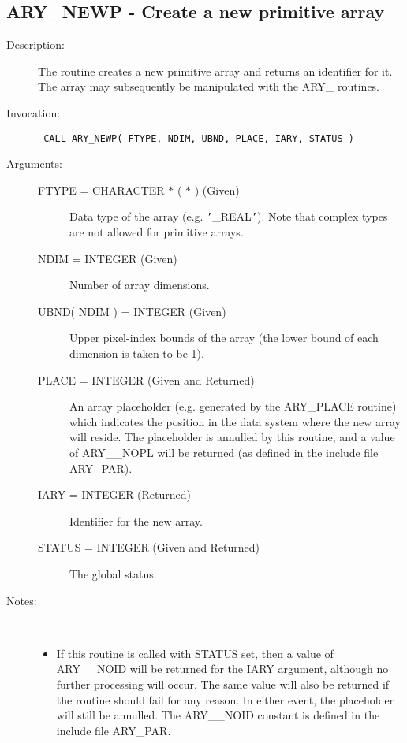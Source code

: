 \documentclass[twoside,11pt]{article}
\newcommand{\xlabel}[1]{}
\newlength{\sstbannerlength}
\newlength{\sstcaptionlength}
\newlength{\sstexampleslength}
\newlength{\sstexampleswidth}
\newcommand{\sstroutine}[3]{
   \goodbreak
   \rule{\textwidth}{0.5mm}
   \vspace{-7ex}
   \newline
   \settowidth{\sstbannerlength}{{\Large {\bf #1}}}
   \setlength{\sstcaptionlength}{\textwidth}
   \setlength{\sstexampleslength}{\textwidth}
   \addtolength{\sstbannerlength}{0.5em}
   \addtolength{\sstcaptionlength}{-2.0\sstbannerlength}
   \addtolength{\sstcaptionlength}{-5.0pt}
   \settowidth{\sstexampleswidth}{{\bf Examples:}}
   \addtolength{\sstexampleslength}{-\sstexampleswidth}
   \parbox[t]{\sstbannerlength}{\flushleft{\Large {\bf #1}}}
   \parbox[t]{\sstcaptionlength}{\center{\Large #2}}
   \parbox[t]{\sstbannerlength}{\flushright{\Large {\bf #1}}}
   \begin{description}
      #3
   \end{description}
}
\newcommand{\sstdescription}[1]{\item[Description:] #1}
\newcommand{\sstinvocation}[1]{\item[Invocation:]\hspace{0.4em}{\tt #1}}
\newcommand{\sstarguments}[1]{
   \item[Arguments:] \mbox{} \\
   \vspace{-3.5ex}
   \begin{description}
      #1
   \end{description}
}
\newcommand{\sstsubsection}[1]{ \item[{#1}] \mbox{} \\}
\newcommand{\sstnotes}[1]{\item[Notes:] \mbox{} \\[1.3ex] #1}
\newcommand{\sstitemlist}[1]{
  \mbox{} \\
  \vspace{-3.5ex}
  \begin{itemize}
     #1
  \end{itemize}
}
\newcommand{\sstitem}{\item}
\newcommand{\ssttt}{\tt}
\renewcommand{\sstroutine}[3]{
      \subsection{#1\xlabel{#1}-\label{#1}#2}
      \begin{description}
         #3
      \end{description}
   }
\renewcommand{\sstdescription}[1]{\item[Description:]
      \begin{description}
         #1
      \end{description}
   }
\renewcommand{\sstinvocation}[1]{\item[Invocation:]
      \begin{description}
         {\ssttt #1}
      \end{description}
   }
\renewcommand{\sstarguments}[1]{
      \item[Arguments:]
      \begin{description}
         #1
      \end{description}
   }
\renewcommand{\sstsubsection}[1]{\item[{#1}]}
\renewcommand{\sstnotes}[1]{\item[Notes:]
      \begin{description}
         #1
      \end{description}
   }
\newcommand{\sstitemlist}[1]{
      \begin{itemize}
         #1
      \end{itemize}
   }
\begin{document}
\sstroutine{
   ARY\_NEWP
}{
   Create a new primitive array
}{
   \sstdescription{
      The routine creates a new primitive array and returns an
      identifier for it. The array may subsequently be manipulated with
      the ARY\_ routines.
   }
   \sstinvocation{
      CALL ARY\_NEWP( FTYPE, NDIM, UBND, PLACE, IARY, STATUS )
   }
   \sstarguments{
      \sstsubsection{
         FTYPE = CHARACTER $*$ ( $*$ ) (Given)
      }{
         Data type of the array (e.g. {\tt '}\_REAL{\tt '}). Note that complex types
         are not allowed for primitive arrays.
      }
      \sstsubsection{
         NDIM = INTEGER (Given)
      }{
         Number of array dimensions.
      }
      \sstsubsection{
         UBND( NDIM ) = INTEGER (Given)
      }{
         Upper pixel-index bounds of the array (the lower bound of each
         dimension is taken to be 1).
      }
      \sstsubsection{
         PLACE = INTEGER (Given and Returned)
      }{
         An array placeholder (e.g. generated by the ARY\_PLACE routine)
         which indicates the position in the data system where the new
         array will reside. The placeholder is annulled by this
         routine, and a value of ARY\_\_NOPL will be returned (as defined
         in the include file ARY\_PAR).
      }
      \sstsubsection{
         IARY = INTEGER (Returned)
      }{
         Identifier for the new array.
      }
      \sstsubsection{
         STATUS = INTEGER (Given and Returned)
      }{
         The global status.
      }
   }
   \sstnotes{
      \sstitemlist{

         \sstitem
         If this routine is called with STATUS set, then a value of
         ARY\_\_NOID will be returned for the IARY argument, although no
         further processing will occur. The same value will also be
         returned if the routine should fail for any reason. In either
         event, the placeholder will still be annulled. The ARY\_\_NOID
         constant is defined in the include file ARY\_PAR.
      }
   }
}
\end{document}
